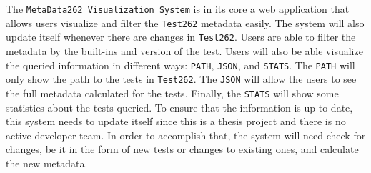 \documentclass[runningheads]{llncs}
\begin{document}

The \texttt{MetaData262 Visualization System} is in its core a web application that allows users visualize and filter the \texttt{Test262} metadata easily. The system will also update itself whenever there are changes in \texttt{Test262}. Users are able to filter the metadata by the built-ins and version of the test. Users will also be able visualize the queried information in different ways: \texttt{PATH}, \texttt{JSON}, and \texttt{STATS}. The \texttt{PATH} will only show the path to the tests in \texttt{Test262}. The \texttt{JSON} will allow the users to see the full metadata calculated for the tests. Finally, the \texttt{STATS} will show some statistics about the tests queried. To ensure that the information is up to date, this system needs to update itself since this is a thesis project and there is no active developer team. In order to accomplish that, the system will need check for changes, be it in the form of new tests or changes to existing ones, and calculate the new metadata.
\end{document}

